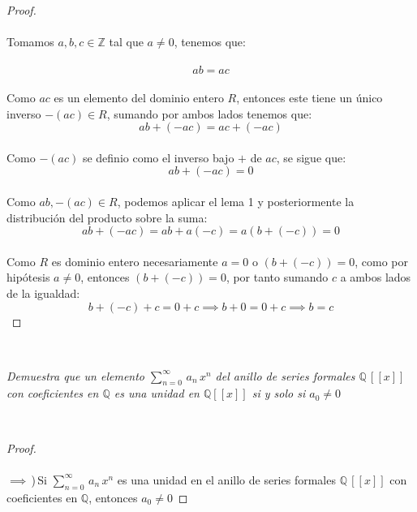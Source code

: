 \documentclass[11pt,letterpaper]{article}
\newcommand{\Z}{\mathbb{Z}}
\newcommand{\Q}{\mathbb{Q}}
\begin{document}
    \begin{proof}\,\\
    \,\\
    Tomamos  $a,b,c\in \Z$ tal que $a\neq 0$, tenemos que:\,\\
    \,\\
    \begin{equation*}
        ab=ac
    \end{equation*}\,\\
    Como $ac$ es un elemento del dominio entero $R$, entonces este tiene un \'unico inverso $-(ac)\in R$, sumando por ambos
    lados tenemos que:\,\\
    \begin{equation*}
        ab+(-ac)=ac+(-ac)
    \end{equation*}\,\\
    Como $-(ac)$ se definio como el inverso bajo $+$ de $ac$, se sigue que:\,\\
    \begin{equation*}
        ab+(-ac)=0
    \end{equation*}\,\\
    Como $ab,-(ac)\in R$, podemos aplicar el lema 1 y posteriormente la distribuci\'on del producto sobre la suma:\,\\
    \begin{equation*}
        ab+(-ac)=ab+a(-c)=a(b+(-c))=0
    \end{equation*}\,\\
    Como $R$ es dominio entero necesariamente $a=0$ o $(b+(-c))=0$, como por hip\'otesis $a\neq 0$, entonces
    $(b+(-c))=0$, por tanto sumando $c$ a ambos lados de la igualdad:\,\\
    \begin{equation*}
        b+(-c)+c=0+c\implies b+0=0+c\implies b=c
    \end{equation*}
\end{proof}\,\\
\begin{tcolorbox}[
	title = \textcolor{black}{\textcolor{white}{Problema 1}},]
\textit{Demuestra que un elemento $\displaystyle \sum_{n=0}^{\infty}\,a_n\,x^n$ del anillo de series formales $\Q\,[[x]]$
con coeficientes en $\Q$ es una unidad en $\Q[[x]]$ si y solo si $a_0\neq 0$
}
\end{tcolorbox}\,\\
\begin{proof}\,\\
    \,\\
    $\implies$\,)\,Si $\displaystyle \sum_{n=0}^{\infty}\,a_n\,x^n$ es una unidad en el anillo de series formales $\Q\,[[x]]$
con coeficientes en $\Q$, entonces $a_0\neq 0$
\end{proof}\,\\
\end{document}
